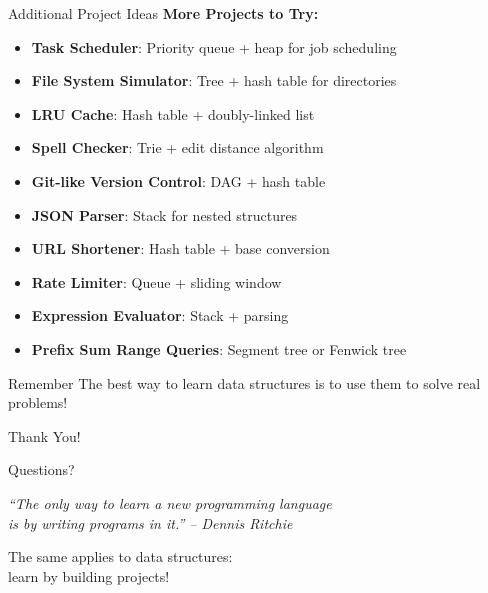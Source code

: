 \documentclass[aspectratio=169,xcolor=dvipsnames]{beamer}
\begin{document}
\begin{frame}{Additional Project Ideas}
  \textbf{More Projects to Try:}
  \begin{itemize}
    \item \textbf{Task Scheduler}: Priority queue + heap for job scheduling
    \item \textbf{File System Simulator}: Tree + hash table for directories
    \item \textbf{LRU Cache}: Hash table + doubly-linked list
    \item \textbf{Spell Checker}: Trie + edit distance algorithm
    \item \textbf{Git-like Version Control}: DAG + hash table
    \item \textbf{JSON Parser}: Stack for nested structures
    \item \textbf{URL Shortener}: Hash table + base conversion
    \item \textbf{Rate Limiter}: Queue + sliding window
    \item \textbf{Expression Evaluator}: Stack + parsing
    \item \textbf{Prefix Sum Range Queries}: Segment tree or Fenwick tree
  \end{itemize}

  \vspace{0.3cm}
  \begin{block}{Remember}
    The best way to learn data structures is to use them to solve real problems!
  \end{block}
\end{frame}

\begin{frame}
  \begin{center}
    {\Huge Thank You!}

    \vspace{1cm}
    {\Large Questions?}

    \vspace{1cm}
    \textit{``The only way to learn a new programming language \\
    is by writing programs in it.'' -- Dennis Ritchie}

    \vspace{0.5cm}
    \small The same applies to data structures: \\
    learn by building projects!
  \end{center}
\end{frame}
\end{document}
